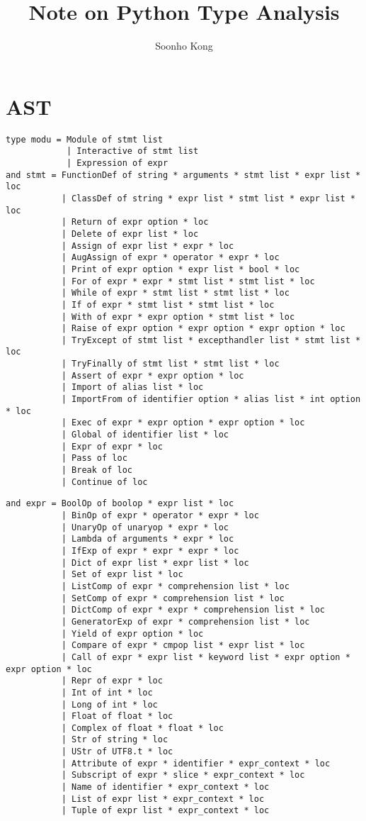 \documentclass[10pt]{article}
\title{Note on Python Type Analysis}
\author{Soonho Kong}
\begin{document}
\maketitle
\section{AST}
\begin{verbatim}
type modu = Module of stmt list
            | Interactive of stmt list
            | Expression of expr
and stmt = FunctionDef of string * arguments * stmt list * expr list * loc
           | ClassDef of string * expr list * stmt list * expr list * loc
           | Return of expr option * loc
           | Delete of expr list * loc
           | Assign of expr list * expr * loc
           | AugAssign of expr * operator * expr * loc
           | Print of expr option * expr list * bool * loc
           | For of expr * expr * stmt list * stmt list * loc
           | While of expr * stmt list * stmt list * loc
           | If of expr * stmt list * stmt list * loc
           | With of expr * expr option * stmt list * loc
           | Raise of expr option * expr option * expr option * loc
           | TryExcept of stmt list * excepthandler list * stmt list * loc
           | TryFinally of stmt list * stmt list * loc
           | Assert of expr * expr option * loc
           | Import of alias list * loc
           | ImportFrom of identifier option * alias list * int option * loc
           | Exec of expr * expr option * expr option * loc
           | Global of identifier list * loc
           | Expr of expr * loc
           | Pass of loc
           | Break of loc
           | Continue of loc
\end{verbatim}
\begin{verbatim}
and expr = BoolOp of boolop * expr list * loc
           | BinOp of expr * operator * expr * loc
           | UnaryOp of unaryop * expr * loc
           | Lambda of arguments * expr * loc
           | IfExp of expr * expr * expr * loc
           | Dict of expr list * expr list * loc
           | Set of expr list * loc
           | ListComp of expr * comprehension list * loc
           | SetComp of expr * comprehension list * loc
           | DictComp of expr * expr * comprehension list * loc
           | GeneratorExp of expr * comprehension list * loc
           | Yield of expr option * loc
           | Compare of expr * cmpop list * expr list * loc
           | Call of expr * expr list * keyword list * expr option * expr option * loc
           | Repr of expr * loc
           | Int of int * loc
           | Long of int * loc 
           | Float of float * loc
           | Complex of float * float * loc                
           | Str of string * loc
           | UStr of UTF8.t * loc
           | Attribute of expr * identifier * expr_context * loc
           | Subscript of expr * slice * expr_context * loc
           | Name of identifier * expr_context * loc
           | List of expr list * expr_context * loc
           | Tuple of expr list * expr_context * loc
\end{verbatim}
\end{document}
